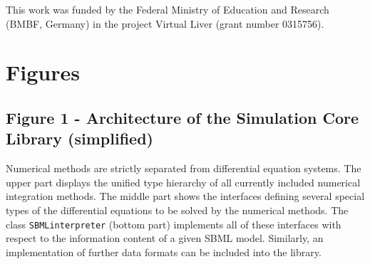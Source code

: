 \documentclass[10pt]{bmc_article}
\newenvironment{bmcformat}{\baselineskip20pt\sloppy\setboolean{publ}{false}}{\baselineskip20pt\sloppy}
\newcommand{\SBMLinterpreter}{\texttt{SBML\-interpreter}}
\begin{document}
\begin{bmcformat}
This work was funded by the Federal Ministry of Education and Research (BMBF,
Germany) in the project Virtual Liver (grant number 0315756).
 

\newpage
{
   }     %





\section*{Figures}
  \subsection*{Figure 1 - Architecture of the Simulation Core Library
  (simplified)}
  
Numerical methods are strictly separated from differential equation systems. The
upper part displays the unified type hierarchy of all currently included numerical integration
methods. The middle part shows the interfaces defining several
special types of the differential equations to be solved by the numerical
methods.
The class \SBMLinterpreter{} (bottom part) implements all of these interfaces
with respect to the information content of a given SBML model. Similarly, an
implementation of further data formats can be included into the
library.


\end{bmcformat}
\end{document}
